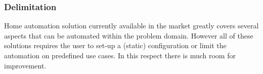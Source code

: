 \subsubsection{Delimitation}
Home automation solution currently available in the market greatly covers several aspects that can be automated within the problem domain. However all of these solutions requires the user to set-up a (static) configuration or limit the automation on predefined use cases. In this respect there is much room for improvement.
